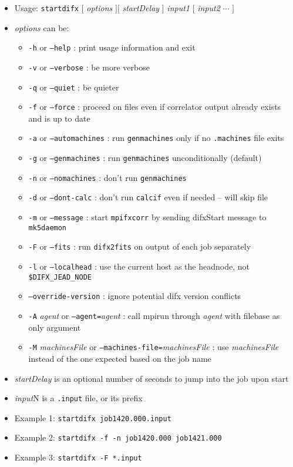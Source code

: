 \begin{itemize}
\item[] Usage: {\tt startdifx} $[$ {\em options} $] [$ {\em startDelay} $]$ {\em input1} $[$ {\em input2} $\cdots$ $]$
\item[] {\em options} can be:
\begin{itemize}
\item[] {\tt -h} or {\tt --help} : print usage information and exit
\item[] {\tt -v} or {\tt --verbose} : be more verbose
\item[] {\tt -q} or {\tt --quiet} : be quieter
\item[] {\tt -f} or {\tt --force} : proceed on files even if correlator output already exists and is up to date
\item[] {\tt -a} or {\tt --automachines} : run {\tt genmachines} only if no {\tt .machines} file exits
\item[] {\tt -g} or {\tt --genmachines} : run {\tt genmachines} unconditionally (default)
\item[] {\tt -n} or {\tt --nomachines} : don't run {\tt genmachines}
\item[] {\tt -d} or {\tt --dont-calc} : don't run {\tt calcif} even if needed -- will skip file
\item[] {\tt -m} or {\tt --message} : start {\tt mpifxcorr} by sending {difxStart} message to {\tt mk5daemon}
\item[] {\tt -F} or {\tt --fits} : run {\tt difx2fits} on output of each job separately
\item[] {\tt -l} or {\tt --localhead} : use the current host as the headnode, not {\tt \$DIFX\_JEAD\_NODE}
\item[] {\tt --override-version} : ignore potential difx version conflicts
\item[] {\tt -A} {\em agent} or {\tt --agent=}{\em agent} : call mpirun through {\em agent} with filebase as only argument
\item[] {\tt -M} {\em machinesFile} or {\tt --machines-file=}{\em machinesFile} : use {\em machinesFile} instead of the one expected based on the job name
\end{itemize} 
\item[] {\em startDelay} is an optional number of seconds to jump into the job upon start
\item[] {\em input}N is a {\tt .input} file, or its prefix
\item[] Example 1: {\tt startdifx job1420.000.input}
\item[] Example 2: {\tt startdifx -f -n job1420.000 job1421.000}
\item[] Example 3: {\tt startdifx -F *.input}
\end{itemize}

